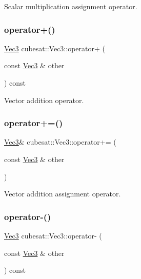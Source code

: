 Scalar multiplication assignment operator. 

\mbox{\label{structcubesat_1_1Vec3_aec51beef99ddbe4e9cab0f0cb57ec21e}} 
\subsubsection{\texorpdfstring{operator+()}{operator+()}}
{\footnotesize\ttfamily \hyperlink{structcubesat_1_1Vec3}{Vec3} cubesat\+::\+Vec3\+::operator+ (\begin{DoxyParamCaption}\item[{const \hyperlink{structcubesat_1_1Vec3}{Vec3} \&}]{other }\end{DoxyParamCaption}) const\hspace{0.3cm}{\ttfamily [inline]}}



Vector addition operator. 

\mbox{\label{structcubesat_1_1Vec3_a6ceb16c57812d7e5185a9bd1f141aa5c}} 
\subsubsection{\texorpdfstring{operator+=()}{operator+=()}}
{\footnotesize\ttfamily \hyperlink{structcubesat_1_1Vec3}{Vec3}\& cubesat\+::\+Vec3\+::operator+= (\begin{DoxyParamCaption}\item[{const \hyperlink{structcubesat_1_1Vec3}{Vec3} \&}]{other }\end{DoxyParamCaption})\hspace{0.3cm}{\ttfamily [inline]}}



Vector addition assignment operator. 

\mbox{\label{structcubesat_1_1Vec3_ac4773756711cdd4229a0bcf48c6203f5}} 
\subsubsection{\texorpdfstring{operator-\/()}{operator-()}\hspace{0.1cm}{\footnotesize\ttfamily [1/2]}}
{\footnotesize\ttfamily \hyperlink{structcubesat_1_1Vec3}{Vec3} cubesat\+::\+Vec3\+::operator-\/ (\begin{DoxyParamCaption}\item[{const \hyperlink{structcubesat_1_1Vec3}{Vec3} \&}]{other }\end{DoxyParamCaption}) const\hspace{0.3cm}{\ttfamily [inline]}}



